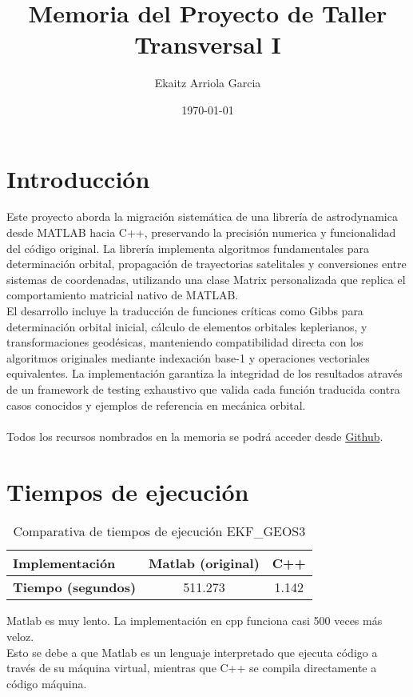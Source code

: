 \documentclass[12pt,a4paper]{article}
\title{Memoria del Proyecto de Taller Transversal I}
\author{Ekaitz Arriola Garcia}
\date{\today}
\begin{document}
\maketitle
\tableofcontents
\newpage




\section{Introducción}

Este proyecto aborda la migración sistemática de una librería de astrodynamica desde MATLAB hacia C++, preservando la precisión numerica y funcionalidad del código original. La librería implementa algoritmos fundamentales para determinación orbital, propagación de trayectorias satelitales y conversiones entre sistemas de coordenadas, utilizando una clase Matrix personalizada que replica el comportamiento matricial nativo de MATLAB. 
\\El desarrollo incluye la traducción de funciones críticas como Gibbs para determinación orbital inicial, cálculo de elementos orbitales keplerianos, y transformaciones geodésicas, manteniendo compatibilidad directa con los algoritmos originales mediante indexación base-1 y operaciones vectoriales equivalentes. La implementación garantiza la integridad de los resultados através de un framework de testing exhaustivo que valida cada función traducida contra casos conocidos y ejemplos de referencia en mecánica orbital.
\\\\
Todos los recursos nombrados en la memoria se podrá acceder desde \href{https://github.com/Ekaitz723/tallerTraversal1/}{Github}.



\section{Tiempos de ejecución}

\begin{table}[H]
\centering
\begin{tabular}{|l|c|c|}
\hline
Implementación & Matlab (original) & C++ \\
\hline
\textbf{Tiempo (segundos)} & 511.273 & 1.142 \\
\hline
\end{tabular}
\caption{Comparativa de tiempos de ejecución EKF\_GEOS3}
\label{tab:tiempos}
\end{table}
Matlab es muy lento. La implementación en cpp funciona casi 500 veces más veloz.
\\Esto se debe a que Matlab es un lenguaje interpretado que ejecuta código a través de su máquina virtual, mientras que C++ se compila directamente a código máquina.
\end{document}
